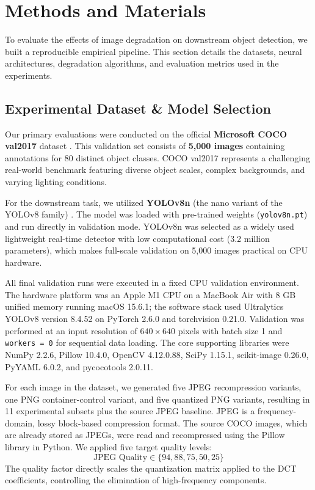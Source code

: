 \documentclass[12pt, a4paper]{article}
\begin{document}
\section{Methods and Materials}
To evaluate the effects of image degradation on downstream object detection, we built a reproducible empirical pipeline. This section details the datasets, neural architectures, degradation algorithms, and evaluation metrics used in the experiments.

\subsection{Experimental Dataset \& Model Selection}
Our primary evaluations were conducted on the official \textbf{Microsoft COCO val2017} dataset \cite{lin2014}. This validation set consists of \textbf{5,000 images} containing annotations for 80 distinct object classes. COCO val2017 represents a challenging real-world benchmark featuring diverse object scales, complex backgrounds, and varying lighting conditions.

For the downstream task, we utilized \textbf{YOLOv8n} (the nano variant of the YOLOv8 family) \cite{jocher2023}. The model was loaded with pre-trained weights (\texttt{yolov8n.pt}) and run directly in validation mode. YOLOv8n was selected as a widely used lightweight real-time detector with low computational cost (3.2 million parameters), which makes full-scale validation on 5,000 images practical on CPU hardware.

\noindent All final validation runs were executed in a fixed CPU validation environment. The hardware platform was an Apple M1 CPU on a MacBook Air with 8 GB unified memory running macOS 15.6.1; the software stack used Ultralytics YOLOv8 version 8.4.52 on PyTorch 2.6.0 and torchvision 0.21.0. Validation was performed at an input resolution of $640\times640$ pixels with batch size 1 and \texttt{workers = 0} for sequential data loading. The core supporting libraries were NumPy 2.2.6, Pillow 10.4.0, OpenCV 4.12.0.88, SciPy 1.15.1, scikit-image 0.26.0, PyYAML 6.0.2, and pycocotools 2.0.11.

For each image in the dataset, we generated five JPEG recompression variants, one PNG container-control variant, and five quantized PNG variants, resulting in 11 experimental subsets plus the source JPEG baseline. JPEG is a frequency-domain, lossy block-based compression format. The source COCO images, which are already stored as JPEGs, were read and recompressed using the Pillow library in Python. We applied five target quality levels:
$$\text{JPEG Quality} \in \{94, 88, 75, 50, 25\}$$
The quality factor directly scales the quantization matrix applied to the DCT coefficients, controlling the elimination of high-frequency components.
\end{document}
